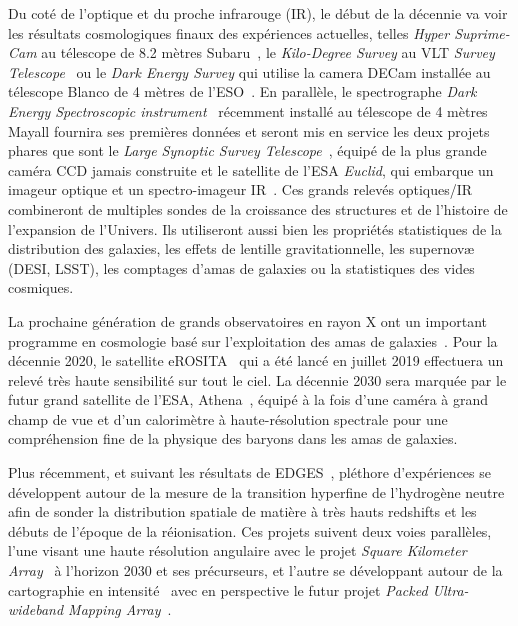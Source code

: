 Du coté de l'optique et du proche infrarouge (IR), le début de la
décennie va voir les résultats cosmologiques finaux des expériences
actuelles, telles \emph{Hyper Suprime-Cam} au télescope de 8.2 mètres
Subaru~\citep[HSC, ][]{SUBARU2018}, le \emph{Kilo-Degree Survey} au
VLT \emph{Survey Telescope}~\citep[KiDS, ][]{KiDS2013} ou le \emph{Dark Energy
Survey} qui utilise la camera DECam installée au télescope Blanco de 4 mètres
de l'ESO~\citep[DES, ][]{DES2016}. En parallèle, le
spectrographe \emph{Dark Energy Spectroscopic instrument}~\citep[DESI,
][]{DESI2016}
récemment installé au télescope de 4 mètres Mayall fournira ses
premières données et seront mis en
service les deux projets phares que sont le \emph{Large Synoptic
Survey Telescope}~\citep[LSST, ][]{LSST2009}, équipé de la plus grande caméra
CCD jamais construite %
et le satellite de l'ESA \emph{Euclid}, qui embarque
un imageur optique et un spectro-imageur IR~\citep{EUCLID2011}. Ces
grands relevés optiques/IR combineront de multiples sondes de la
croissance des structures et de l'histoire de l'expansion de l'Univers.
Ils utiliseront aussi bien les propriétés statistiques de la distribution
des galaxies, les effets de lentille gravitationnelle, les supernovæ
(DESI, LSST), les comptages d'amas de galaxies ou la statistiques des vides
cosmiques. 

La prochaine génération de grands observatoires en rayon X ont un
important programme en cosmologie basé sur l'exploitation des amas de
galaxies~\citep{eROSITA_cosmo}. Pour la décennie 2020, le satellite
eROSITA~\citep{eROSITA2014} qui a été lancé en juillet 2019 effectuera
un relevé très haute sensibilité sur tout le ciel. La décennie 2030
sera marquée par le futur grand satellite de l'ESA,
Athena~\citep{ATHENA2013},
équipé à la fois d'une caméra à grand champ de vue et d'un calorimètre
à haute-résolution spectrale pour une compréhension fine de la
physique des baryons dans les amas de galaxies. 

Plus récemment, et suivant les résultats de
EDGES~\citep{EDGES2018Natur}, pléthore d'expériences se développent
autour de la mesure de la transition hyperfine de l'hydrogène neutre
afin de sonder la distribution spatiale de matière à très hauts
redshifts et les débuts
de l'époque de la réionisation. Ces projets suivent deux voies
parallèles, l'une visant une haute résolution angulaire avec le projet
\emph{Square Kilometer Array}~\citep[SKA][]{SKA2018} à l'horizon 2030 et ses
précurseurs, et l'autre se développant autour de la cartographie en
intensité~\citep[par exemple][]{TIANLAI2018, HIRAX2016} avec en perspective le
futur projet \emph{Packed Ultra-wideband Mapping
Array}~\citep[PUMA,][]{PUMA2019}.\\

